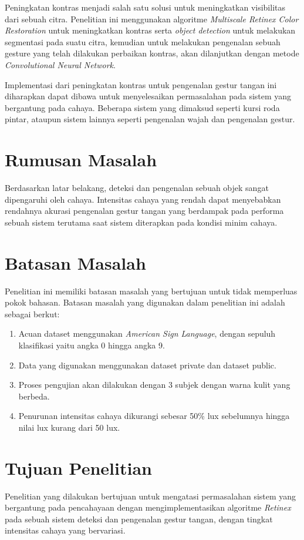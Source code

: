 Peningkatan kontras menjadi salah satu solusi untuk meningkatkan visibilitas dari sebuah citra. Penelitian ini menggunakan algoritme \emph{Multiscale Retinex Color Restoration} untuk meningkatkan kontras serta \emph{object detection} untuk melakukan segmentasi pada suatu citra, kemudian untuk melakukan pengenalan sebuah gesture yang telah dilakukan perbaikan kontras, akan dilanjutkan dengan metode \emph{Convolutional Neural Network}. 

Implementasi dari peningkatan kontras untuk pengenalan gestur tangan ini diharapkan dapat dibawa untuk menyelesaikan permasalahan pada sistem yang bergantung pada cahaya. Beberapa sistem yang dimaksud seperti kursi roda pintar, ataupun sistem lainnya seperti pengenalan wajah dan pengenalan gestur. 
\section{Rumusan Masalah}
Berdasarkan latar belakang, deteksi dan pengenalan sebuah objek sangat dipengaruhi oleh cahaya.
Intensitas cahaya yang rendah dapat menyebabkan rendahnya akurasi pengenalan gestur tangan yang berdampak pada performa sebuah sistem terutama saat sistem diterapkan pada kondisi minim cahaya.
\section{Batasan Masalah}

Penelitian ini memiliki batasan masalah yang bertujuan untuk tidak memperluas pokok bahasan. Batasan masalah yang digunakan dalam penelitian ini adalah sebagai berkut:
\begin{enumerate}
\item Acuan dataset menggunakan \emph{American Sign Language}, dengan sepuluh klasifikasi yaitu angka 0 hingga angka 9.
\item Data yang digunakan menggunakan dataset private dan dataset public.
\item Proses pengujian akan dilakukan dengan 3 subjek dengan warna kulit yang berbeda.
\item Penurunan intensitas cahaya dikurangi sebesar 50\% lux sebelumnya hingga nilai lux kurang dari 50 lux.
\end{enumerate}
\section{Tujuan Penelitian}
Penelitian yang dilakukan bertujuan untuk mengatasi permasalahan sistem yang bergantung pada pencahayaan dengan mengimplementasikan algoritme \emph{Retinex} pada sebuah sistem deteksi dan pengenalan gestur tangan, dengan tingkat intensitas cahaya yang bervariasi.

